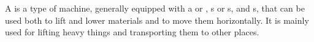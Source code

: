 \begin{module}[id=crane]
\begin{definition}
  A  is a type of machine, generally equipped with a  or
  , s or s, and
  s, that can be used both to lift and lower materials and to move
  them horizontally. It is mainly used for lifting heavy things and transporting them to
  other places.
\end{definition}

\end{module}
